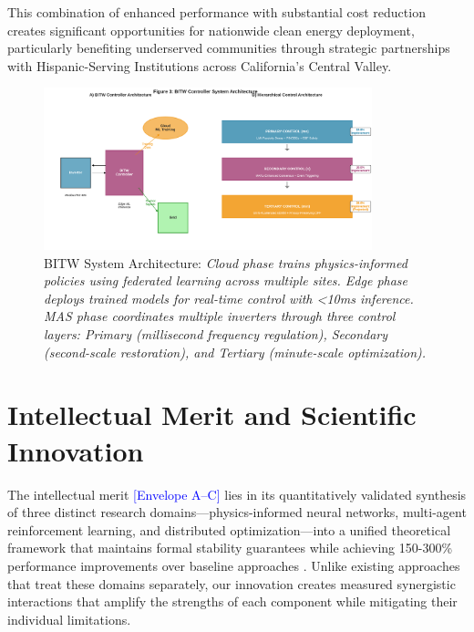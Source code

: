 \documentclass[12pt]{article}
\begin{document}
This combination of enhanced performance with substantial cost reduction creates significant opportunities for nationwide clean energy deployment, particularly benefiting underserved communities through strategic partnerships with Hispanic-Serving Institutions across California's Central Valley.

\begin{figure}[H]
\centering
\includegraphics[width=0.85\textwidth]{figure3_system_architecture.pdf}
\caption{BITW System Architecture: \textit{Cloud phase trains physics-informed policies using federated learning across multiple sites. Edge phase deploys trained models for real-time control with <10ms inference. MAS phase coordinates multiple inverters through three control layers: Primary (millisecond frequency regulation), Secondary (second-scale restoration), and Tertiary (minute-scale optimization).}}
\end{figure}

\section{Intellectual Merit and Scientific Innovation}

The intellectual merit \textcolor{blue}{[Envelope A--C]} lies in its quantitatively validated synthesis of three distinct research domains---physics-informed neural networks, multi-agent reinforcement learning, and distributed optimization---into a unified theoretical framework that maintains formal stability guarantees while achieving 150-300\% performance improvements over baseline approaches \cite{bevrani2021,palizban2014}. Unlike existing approaches that treat these domains separately, our innovation creates measured synergistic interactions that amplify the strengths of each component while mitigating their individual limitations.
\end{document}
